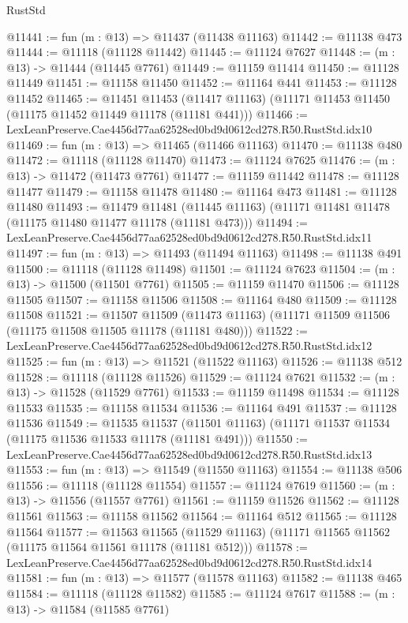\begin{lexlean}{RustStd}
\begin{coremodule}
@11441 := fun (m : @13) => @11437 (@11438 @11163)
@11442 := @11138 @473
@11444 := @11118 (@11128 @11442)
@11445 := @11124 @7627
@11448 := (m : @13) -> @11444 (@11445 @7761)
@11449 := @11159 @11414
@11450 := @11128 @11449
@11451 := @11158 @11450
@11452 := @11164 @441
@11453 := @11128 @11452
@11465 := @11451
    @11453
    (@11417 @11163)
    (@11171 @11453 @11450 (@11175 @11452 @11449 @11178 (@11181 @441)))
@11466 := LexLeanPreserve.Cae4456d77aa62528ed0bd9d0612cd278.R50.RustStd.idx10
@11469 := fun (m : @13) => @11465 (@11466 @11163)
@11470 := @11138 @480
@11472 := @11118 (@11128 @11470)
@11473 := @11124 @7625
@11476 := (m : @13) -> @11472 (@11473 @7761)
@11477 := @11159 @11442
@11478 := @11128 @11477
@11479 := @11158 @11478
@11480 := @11164 @473
@11481 := @11128 @11480
@11493 := @11479
    @11481
    (@11445 @11163)
    (@11171 @11481 @11478 (@11175 @11480 @11477 @11178 (@11181 @473)))
@11494 := LexLeanPreserve.Cae4456d77aa62528ed0bd9d0612cd278.R50.RustStd.idx11
@11497 := fun (m : @13) => @11493 (@11494 @11163)
@11498 := @11138 @491
@11500 := @11118 (@11128 @11498)
@11501 := @11124 @7623
@11504 := (m : @13) -> @11500 (@11501 @7761)
@11505 := @11159 @11470
@11506 := @11128 @11505
@11507 := @11158 @11506
@11508 := @11164 @480
@11509 := @11128 @11508
@11521 := @11507
    @11509
    (@11473 @11163)
    (@11171 @11509 @11506 (@11175 @11508 @11505 @11178 (@11181 @480)))
@11522 := LexLeanPreserve.Cae4456d77aa62528ed0bd9d0612cd278.R50.RustStd.idx12
@11525 := fun (m : @13) => @11521 (@11522 @11163)
@11526 := @11138 @512
@11528 := @11118 (@11128 @11526)
@11529 := @11124 @7621
@11532 := (m : @13) -> @11528 (@11529 @7761)
@11533 := @11159 @11498
@11534 := @11128 @11533
@11535 := @11158 @11534
@11536 := @11164 @491
@11537 := @11128 @11536
@11549 := @11535
    @11537
    (@11501 @11163)
    (@11171 @11537 @11534 (@11175 @11536 @11533 @11178 (@11181 @491)))
@11550 := LexLeanPreserve.Cae4456d77aa62528ed0bd9d0612cd278.R50.RustStd.idx13
@11553 := fun (m : @13) => @11549 (@11550 @11163)
@11554 := @11138 @506
@11556 := @11118 (@11128 @11554)
@11557 := @11124 @7619
@11560 := (m : @13) -> @11556 (@11557 @7761)
@11561 := @11159 @11526
@11562 := @11128 @11561
@11563 := @11158 @11562
@11564 := @11164 @512
@11565 := @11128 @11564
@11577 := @11563
    @11565
    (@11529 @11163)
    (@11171 @11565 @11562 (@11175 @11564 @11561 @11178 (@11181 @512)))
@11578 := LexLeanPreserve.Cae4456d77aa62528ed0bd9d0612cd278.R50.RustStd.idx14
@11581 := fun (m : @13) => @11577 (@11578 @11163)
@11582 := @11138 @465
@11584 := @11118 (@11128 @11582)
@11585 := @11124 @7617
@11588 := (m : @13) -> @11584 (@11585 @7761)

\end{coremodule}
\end{lexlean}
